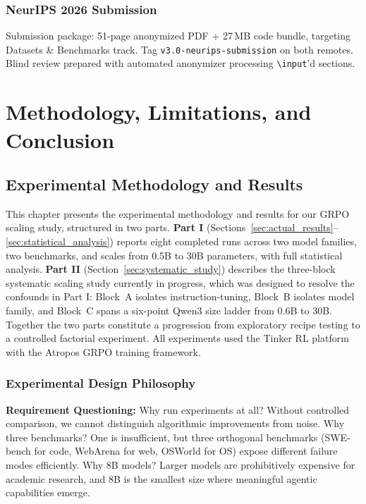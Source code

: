 \documentclass[12pt,a4paper]{report}
\theoremstyle{definition}
\begin{document}
\section{NeurIPS 2026 Submission}
\label{sec:neurips}

Submission package: 51-page anonymized PDF + 27\,MB code bundle, targeting Datasets \& Benchmarks track.
Tag \texttt{v3.0-neurips-submission} on both remotes. Blind review prepared with automated anonymizer
processing \texttt{\textbackslash input}'d sections.



\part{Methodology, Limitations, and Conclusion}

\chapter{Experimental Methodology and Results}
\label{ch:experiments}

This chapter presents the experimental methodology and results for our GRPO scaling study, structured in two parts.  \textbf{Part I} (Sections~\ref{sec:actual_results}--\ref{sec:statistical_analysis}) reports eight completed runs across two model families, two benchmarks, and scales from 0.5B to 30B parameters, with full statistical analysis.  \textbf{Part II} (Section~\ref{sec:systematic_study}) describes the three-block systematic scaling study currently in progress, which was designed to resolve the confounds in Part I: Block~A isolates instruction-tuning, Block~B isolates model family, and Block~C spans a six-point Qwen3 size ladder from 0.6B to 30B.  Together the two parts constitute a progression from exploratory recipe testing to a controlled factorial experiment.  All experiments used the Tinker RL platform with the Atropos GRPO training framework.

\vspace{0.3cm}

\section{Experimental Design Philosophy}
\label{sec:design_philosophy}

\textbf{Requirement Questioning:} Why run experiments at all? Without controlled comparison, we cannot distinguish algorithmic improvements from noise. Why three benchmarks? One is insufficient, but three orthogonal benchmarks (SWE-bench for code, WebArena for web, OSWorld for OS) expose different failure modes efficiently. Why 8B models? Larger models are prohibitively expensive for academic research, and 8B is the smallest size where meaningful agentic capabilities emerge.
\end{document}
